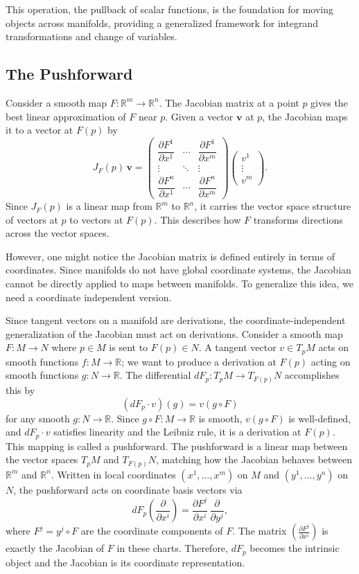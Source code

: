 \documentclass[12pt]{article}
\newcommand{\R}{\mathbb{R}}
\newcommand{\p}{\partial}
\newcommand{\bv}[1]{\mathbf{#1}}
\begin{document}
This operation, the pullback of scalar functions, is the foundation for moving objects across manifolds, providing a generalized framework for integrand transformations and change of variables. 

\subsection{The Pushforward}

Consider a smooth map $F: \R^m \to \R^n$. The Jacobian matrix at a point $p$ gives the best linear approximation of $F$ near $p$. Given a vector $\bv{v}$ at $p$, the Jacobian maps it to a vector at $F(p)$ by
\[
J_F(p)\,\bv{v} =
\begin{pmatrix}
\dfrac{\p F^1}{\p x^1} & \cdots & \dfrac{\p F^1}{\p x^m} \\[6pt]
\vdots & \ddots & \vdots \\[2pt]
\dfrac{\p F^n}{\p x^1} & \cdots & \dfrac{\p F^n}{\p x^m}
\end{pmatrix}
\begin{pmatrix} v^1 \\ \vdots \\ v^m \end{pmatrix}.
\]
Since $J_F(p)$ is a linear map from $\R^m$ to $\R^n$, it carries the vector space structure of vectors at $p$ to vectors at $F(p)$. This describes how $F$ transforms directions across the vector spaces.

However, one might notice the Jacobian matrix is defined entirely in terms of coordinates. Since manifolds do not have global coordinate systems, the Jacobian cannot be directly applied to maps between manifolds. To generalize this idea, we need a coordinate independent version.

Since tangent vectors on a manifold are derivations, the coordinate-independent generalization of the Jacobian must act on derivations. Consider a smooth map $F: M \to N$ where $p \in M$ is sent to $F(p) \in N$. A tangent vector $v \in T_pM$ acts on smooth functions $f: M \to \R$; we want to produce a derivation at $F(p)$ acting on smooth functions $g: N \to \R$. The differential $dF_p: T_pM \to T_{F(p)}N$ accomplishes this by
\[
(dF_p \cdot v)(g) = v(g \circ F)
\]
for any smooth $g: N \to \R$. Since $g \circ F: M \to \R$ is smooth, $v(g \circ F)$ is well-defined, and $dF_p \cdot v$ satisfies linearity and the Leibniz rule, it is a derivation at $F(p)$. This mapping is called a pushforward.
The pushforward is a linear map between the vector spaces $T_pM$ and $T_{F(p)}N$, matching how the Jacobian behaves between $\R^m$ and $\R^n$. Written in local coordinates $(x^1, \dots, x^m)$ on $M$ and $(y^1, \dots, y^n)$ on $N$, the pushforward acts on coordinate basis vectors via
\[
dF_p\!\left(\frac{\p}{\p x^i}\right) = \frac{\p F^j}{\p x^i}\,\frac{\p}{\p y^j},
\]
where $F^j = y^j \circ F$ are the coordinate components of $F$. The matrix $\left(\frac{\p F^j}{\p x^i}\right)$ is exactly the Jacobian of $F$ in these charts. Therefore, $dF_p$ becomes the intrinsic object and the Jacobian is its coordinate representation.
\end{document}
